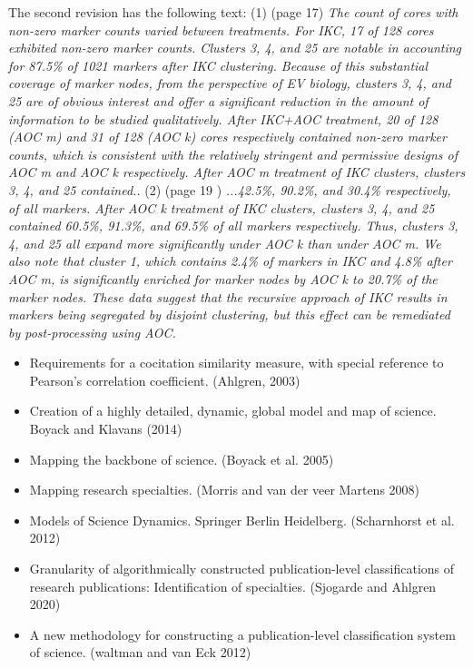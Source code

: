 \documentclass[11pt, oneside]{article}   	%
\begin{document}
The second revision has the following text: (1)  (page 17)   \emph{The count of cores with non-zero marker counts varied between treatments. For IKC, 17 of 128 cores exhibited non-zero marker counts. Clusters 3, 4, and 25 are notable in accounting for 87.5\% of 1021 markers after IKC clustering. Because of this substantial coverage of marker nodes, from the perspective of EV biology, clusters 3, 4, and 25 are of obvious interest and offer a significant reduction in the amount of information to be studied qualitatively.
After IKC+AOC treatment, 20 of 128 (AOC m) and 31 of 128 (AOC k) cores respectively contained non-zero marker counts, which is consistent with the relatively stringent and permissive designs of AOC m and AOC k respectively. After AOC m treatment of IKC clusters, clusters 3, 4, and 25 contained..}
(2) (page 19 ) \emph{...42.5\%, 90.2\%, and 30.4\% respectively, of all markers. After AOC k treatment of IKC clusters, clusters 3, 4, and 25 contained 60.5\%, 91.3\%, and 69.5\% of all markers respectively. Thus, clusters 3, 4, and 25 all expand more significantly under AOC k than under AOC m. We also note that cluster 1, which contains 2.4\% of markers in IKC and 4.8\% after AOC m, is significantly enriched for marker nodes by AOC k to 20.7\% of the marker nodes. These data suggest that the recursive approach of IKC results in markers being segregated by disjoint clustering, but this effect can be remediated by post-processing using AOC.}


\begin{itemize}
\item Requirements for a cocitation similarity measure, with special reference to Pearson’s correlation coefficient. (Ahlgren, 2003)
\item Creation of a highly detailed, dynamic, global model and map of science. Boyack and Klavans (2014)
\item Mapping the backbone of science. (Boyack et al. 2005) 
\item Mapping research specialties. (Morris and van der veer Martens 2008)
\item Models of Science Dynamics. Springer Berlin Heidelberg. (Scharnhorst et al. 2012)
\item Granularity of algorithmically constructed publication-level classifications of research publications: Identification of specialties. (Sjogarde and Ahlgren 2020)
\item A new methodology for constructing a publication-level classification system of science. (waltman and van Eck 2012)
\end{itemize}
\end{document}
